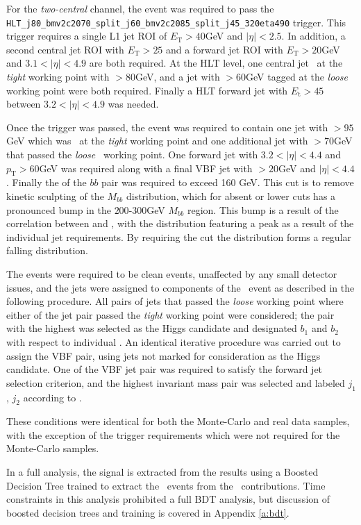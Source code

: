 		For the \textit{two-central} channel, the event was required to pass the \texttt{HLT\_j80\_bmv2c2070\_split\_\-j60\_bmv2c2085\_split\_j45\_320eta490} trigger. This trigger requires a single L1 jet ROI of $E_\text{T} > 40$GeV and $|\eta| < 2.5$. In addition, a second central jet ROI with $E_\text{T} > 25$ and a forward jet ROI with $E_\text{T} > 20$GeV and $3.1 < |\eta| < 4.9$ are both required.
		At the HLT level, one central jet \btagged\, at the \textit{tight} working point with \pt $>80$GeV, and a jet with \pt$>60$GeV tagged at the \textit{loose} working point were both required. Finally a HLT forward jet with $E_\text{t}>45$ between $3.2 < |\eta| < 4.9$ was needed.

		Once the trigger was passed, the event was required to contain one jet with \pt$>95$GeV which was \btagged\, at the \textit{tight} working point and one additional jet with \pt$>70$GeV that passed the \textit{loose} \btag\, working point. One forward jet with $3.2 < |\eta| < 4.4$ and $p_{\text{T}}>60$GeV was required along with a final VBF jet with \pt$>20$GeV and $|\eta| < 4.4$. Finally the \pt of the $bb$ pair was required to exceed 160 GeV. This cut is to remove kinetic sculpting of the $M_{bb}$ distribution, which for absent or lower \ptbb cuts has a pronounced bump in the $200$-$300$GeV $M_{bb}$ region. This bump is a result of the correlation between \mbb and \ptbb, with the \ptbb distribution featuring a peak as a result of the individual jet \pt requirements. By requiring the \ptbb cut the \mbb distribution forms a regular falling distribution.

		The events were required to be clean events, unaffected by any small detector issues, and the jets were assigned to components of the \VBFHBB\, event as described in the following procedure. All pairs of jets that passed the \textit{loose} working point where either of the jet pair passed the \textit{tight} working point were considered; the pair with the highest \ptbb was selected as the Higgs candidate and designated \bjets $b_1$ and $b_2$ with respect to individual \pt. An identical iterative procedure was carried out to assign the VBF pair, using jets not marked for consideration as the Higgs candidate. One of the VBF jet pair was required to satisfy the forward jet selection criterion, and the highest invariant mass pair was selected and labeled $j_1$, $j_2$ according to \pt.

		These conditions were identical for both the Monte-Carlo and real data samples, with the exception of the trigger requirements which were not required for the Monte-Carlo samples.

		In a full analysis, the signal is extracted from the results using a Boosted Decision Tree trained to extract the \VBFHBB\, events from the \ggF\, contributions. Time constraints in this analysis prohibited a full BDT analysis, but discussion of boosted decision trees and training is covered in Appendix \ref{a:bdt}.


\endinput
